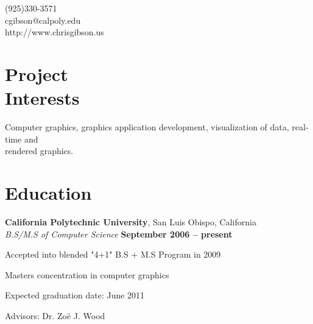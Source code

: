 \documentclass[margin,line]{resume}
\begin{document}
\begin{resume}

{
	\sc
	\color{ColorOne}
    \hfill (925)330-3571                  \vspace{0mm}\\\vspace{0mm}%
    \hfill cgibson@calpoly.edu            \vspace{0mm}\\\vspace{0mm}%
    \hfill http://www.chrisgibson.us      \vspace{0mm}\\\vspace{-4.5mm}%
}


    \section{\mysidestyle Project\\Interests}

	Computer graphics, graphics application development, visualization of data, real-time and \\
	rendered graphics.


    \section{\mysidestyle Education}

    \textbf{California Polytechnic University}, San Luis Obispo, California \vspace{2mm}\\\vspace{1mm}%
    \textsl{B.S/M.S of Computer Science} \hfill \textbf{ September 2006 -- present}\vspace{-3mm}\\\vspace{-1mm}%
    \begin{list2}
    	\item Accepted into blended "4+1" B.S + M.S Program in 2009
        \item Masters concentration in computer graphics
        \item Expected graduation date: June 2011
        \item Advisors:  Dr. Zo\"{e} J. Wood
    \end{list2}\vspace{-1.5mm}



\end{resume}
\end{document}
